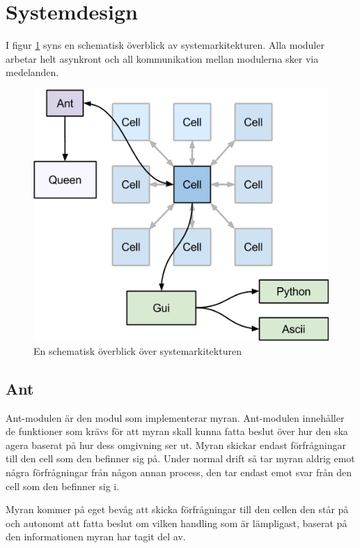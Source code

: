 \section{Systemdesign}

I figur \ref{fig:design} syns en schematisk överblick av systemarkitekturen. Alla moduler arbetar helt asynkront och all kommunikation mellan modulerna sker via medelanden.

\begin{figure}

\includegraphics[scale=0.8]{Figures/systemdesign.png}
\caption{En schematisk överblick över systemarkitekturen}
\label{fig:design}
\end{figure}

\subsection{Ant}

Ant-modulen är den modul som implementerar myran. Ant-modulen innehåller de funktioner som krävs för att myran skall kunna fatta beslut över hur den ska agera baserat på hur dess omgivning ser ut. Myran skickar endast förfrågningar till den cell som den befinner sig på. Under normal drift så tar myran aldrig emot några förfrågningar från någon annan process, den tar endast emot svar från den cell som den befinner sig i.

Myran kommer på eget bevåg att skicka förfrågningar till den cellen den står på och autonomt att fatta beslut om vilken handling som är lämpligast, baserat på den informationen myran har tagit del av.

